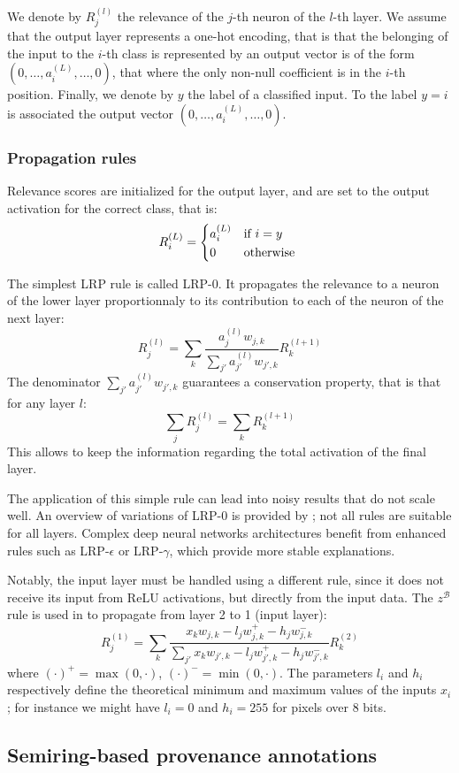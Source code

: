 \documentclass{../cs-classes/cs-classes}
\begin{document}
We denote by $R^{(l)}_j$ the relevance of the $j$-th neuron of the $l$-th layer. We assume that the output layer represents a one-hot encoding, that is that the belonging of the input to the $i$-th class is represented by an output vector is of the form $(0, \dots, a^{(L)}_i, \dots, 0)$, that where the only non-null coefficient is in the $i$-th position. Finally, we denote by $y$ the label of a classified input. To the label $y=i$ is associated the output vector $(0, \dots, a^{(L)}_i, \dots, 0)$.

\subsubsection{Propagation rules}
Relevance scores are initialized for the output layer, and are set to the output activation for the correct class, that is:
\begin{equation}
    R^{(L)}_i = \begin{cases*}
        a^{(L)}_i & if $i = y$\\
        0 & otherwise
    \end{cases*}
\end{equation}

The simplest LRP rule is called LRP-0. It propagates the relevance to a neuron of the lower layer proportionnaly to its contribution to each of the neuron of the next layer:
\begin{equation}
    R^{(l)}_j = \sum_{k}\frac{a^{(l)}_jw_{j, k}}{\sum_{j'}a^{(l)}_{j'}w_{j', k}} R^{(l+1)}_k
\end{equation}
The denominator $\sum_{j'}a^{(l)}_{j'}w_{j', k}$ guarantees a conservation property, that is that for any layer $l$:
\begin{equation*}
    \sum_j R^{(l)}_j = \sum_k R^{(l+1)}_k
\end{equation*}
This allows to keep the information regarding the total activation of the final layer.

The application of this simple rule can lead into noisy results that do not scale well. An overview of variations of LRP-0 is provided by \cite{montavon-lrp}; not all rules are suitable for all layers. Complex deep neural networks architectures benefit from enhanced rules such as LRP-$\epsilon$ or LRP-$\gamma$, which provide more stable explanations.

Notably, the input layer must be handled using a different rule, since it does not receive its input from ReLU activations, but directly from the input data. The $z^\mathcal{B}$ rule is used in \cite{montavon-lrp} to propagate from layer 2 to 1 (input layer):
\begin{equation}
    R^{(1)}_j = \sum_{k} \frac{x_kw_{j, k} - l_jw^+_{j, k} - h_jw_{j, k}^-}{\sum_{j'}x_kw_{j', k} - l_jw^+_{j', k} - h_jw_{j', k}^-} R^{(2)}_k
\end{equation}
where $(\cdot)^+=\max(0, \cdot)$, $(\cdot)^-=\min(0, \cdot)$. The parameters $l_i$ and $h_i$ respectively define the theoretical minimum and maximum values of the inputs $x_i$; for instance we might have $l_i=0$ and $h_i=255$ for pixels over 8 bits.

\subsection{Semiring-based provenance annotations}

\newpage
\nocite{*}
\printbibliography
\end{document}
